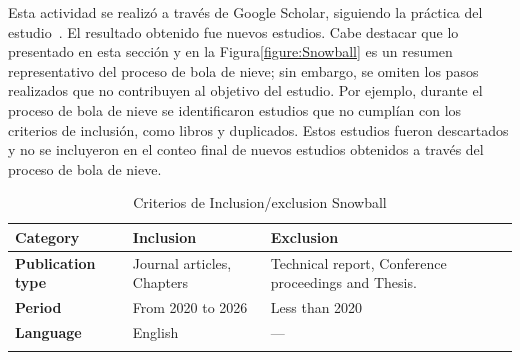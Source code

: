 Esta actividad se realizó a través de Google Scholar, siguiendo la práctica del estudio~\cite{Ali-01}. El resultado obtenido fue 
\snowballNewStudies{} nuevos estudios. Cabe destacar que lo presentado en esta sección y en la Figura\ref{figure:Snowball} es un resumen 
representativo del proceso de bola de nieve; sin embargo, se omiten los pasos realizados que no contribuyen al objetivo del estudio. 
Por ejemplo, durante el proceso de bola de nieve se identificaron estudios que no cumplían con los criterios de inclusión, como libros y 
duplicados. Estos estudios fueron descartados y no se incluyeron en el conteo final de nuevos estudios obtenidos a través del proceso de 
bola de nieve.

\begin{table}[htbp]
	\centering
	\renewcommand{\arraystretch}{1}  %
	\begin{tabular}{p{1.5cm}p{2.2cm}p{3.9cm}}
		\toprule
		\textbf{Category}         & \textbf{Inclusion} & \textbf{Exclusion}                                                                                           \\
		\midrule
		\textbf{Publication type} & Journal articles, Chapters  & Technical report, Conference proceedings and Thesis. \\
		\addlinespace[0.8em]
		\textbf{Period}           & From 2020 to 2026  & Less than 2020                                                                                                \\
		\addlinespace[0.8em]
		\textbf{Language}         & English            & ---                                                                                                              \\
		\bottomrule
		\vspace{1pt}
	\end{tabular}
	\caption{Criterios de Inclusion/exclusion Snowball}\label{table:inclusion_exclusion_criteria}
\end{table}
